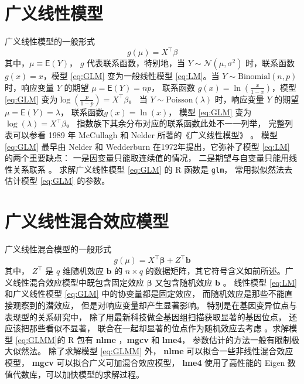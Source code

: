 \documentclass[12pt,a4paper,UTF8,twoside]{book}
\theoremstyle{definition}
\theoremstyle{definition}
\theoremstyle{definition}
\theoremstyle{remark}
\begin{document}
\hypertarget{sec:Generalized-Linear-Models}{%
\section{广义线性模型}\label{sec:Generalized-Linear-Models}}

广义线性模型的一般形式 \begin{equation}
g(\mu) = X^{\top}\beta  \label{eq:GLM}
\end{equation} \noindent 其中，\(\mu \equiv \mathsf{E}(Y)\)， \(g\)
代表联系函数，特别地，当 \(Y \sim \mathcal{N}(\mu,\sigma^2)\)
时，联系函数 \(g(x) = x\)，模型 \eqref{eq:GLM} 变为一般线性模型
\eqref{eq:LM}。当 \(Y \sim \mathrm{Binomial}(n,p)\) 时，响应变量 \(Y\)
的期望 \(\mu =\mathsf{E}(Y) = np\)， 联系函数
\(g(x)=\ln(\frac{x}{1-x})\)，模型 \eqref{eq:GLM}
变为\(\log(\frac{p}{1-p})=X^{\top}\beta\)。 当
\(Y \sim \mathrm{Poisson}(\lambda)\) 时，响应变量 \(Y\) 的期望
\(\mu =\mathsf{E}(Y) = \lambda\)， 联系函数\(g(x) = \ln(x)\)， 模型
\eqref{eq:GLM} 变为 \(\log(\lambda) = X^{\top}\beta\)。
指数族下其余分布对应的联系函数此处不一一列举， 完整列表可以参看 1989 年
McCullagh 和 Nelder 所著的《广义线性模型》 \citep{McCullagh1989}。 模型
\eqref{eq:GLM} 最早由 Nelder 和 Wedderburn
在1972年提出\citep{Nelder1972}，它弥补了模型 \eqref{eq:LM}
的两个重要缺点： 一是因变量只能取连续值的情况，
二是期望与自变量只能用线性关系联系 \citep{Chen2011}。 求解广义线性模型
\eqref{eq:GLM} 的 R 函数是 \texttt{glm}， 常用拟似然法去估计模型
\eqref{eq:GLM} 的参数。

\hypertarget{sec:Generalized-Linear-Mixed-Effects-Models}{%
\section{广义线性混合效应模型}\label{sec:Generalized-Linear-Mixed-Effects-Models}}

广义线性混合模型的一般形式 \begin{equation}
g(\mu) = X^{\top}\boldsymbol{\beta} + Z^{\top}\mathbf{b}  \label{eq:GLMM}
\end{equation} \noindent 其中， \(Z^{\top}\) 是 \(q\) 维随机效应
\(\mathbf{b}\) 的 \(n \times q\)
的数据矩阵，其它符号含义如前所述。广义线性混合效应模型中既包含固定效应
\(\boldsymbol{\beta}\) 又包含随机效应 \(\mathbf{b}\) 。 线性模型
\eqref{eq:LM} 和广义线性模型 \eqref{eq:GLM} 中的协变量都是固定效应，
而随机效应是那些不能直接观察到的潜效应， 但是对响应变量却产生显著影响。
特别是在基因变异位点与表现型的关系研究中，
除了用最新科技做全基因组扫描获取显著的基因位点，
还应该把那些看似不显著， 联合在一起却显著的位点作为随机效应去考虑
\citep{Yang2010Common}。求解模型 \eqref{eq:GLMM}的 R 包有 \textbf{nlme}
，\textbf{mgcv} 和 \textbf{lme4}， 参数估计的方法一般有限制极大似然法。
除了求解模型 \eqref{eq:GLMM} 外， \textbf{nlme}
可以拟合一些非线性混合效应模型， \textbf{mgcv}
可以拟合广义可加混合效应模型， \textbf{lme4} 使用了高性能的 Eigen
数值代数库，可以加快模型的求解过程。
\end{document}
